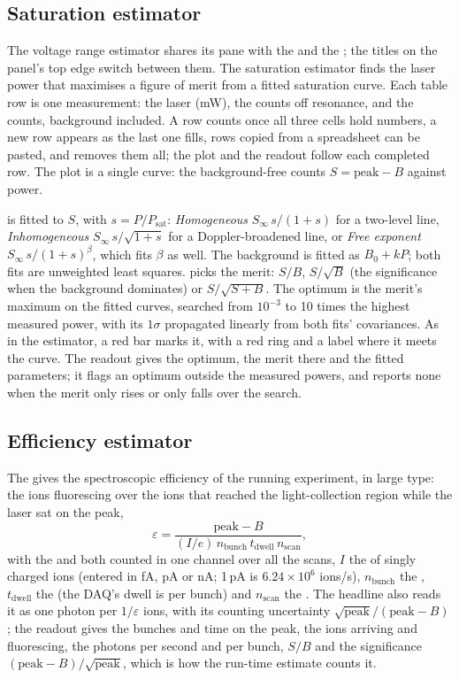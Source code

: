 \subsection{Saturation estimator}

The voltage range estimator shares its pane with the  and
the ; the titles on the panel's top edge
switch between them. The saturation estimator finds the laser power that maximises a
figure of merit from a fitted saturation curve. Each table row is one
measurement: the laser  (mW), the  counts off
resonance, and the  counts, background included. A row counts
once all three cells hold numbers, a new row appears as the last one
fills, rows copied from a spreadsheet can be pasted, and 
removes them all; the plot and the readout follow each completed row.
The plot is a single curve: the background-free counts
$S = \mathrm{peak} - B$ against power.

 is fitted to $S$, with $s = P/P_\mathrm{sat}$:
\emph{Homogeneous} $S_\infty\, s/(1+s)$ for a two-level line,
\emph{Inhomogeneous} $S_\infty\, s/\sqrt{1+s}$ for a Doppler-broadened
line, or \emph{Free exponent} $S_\infty\, s/(1+s)^\beta$, which fits
$\beta$ as well. The background is fitted as $B_0 + kP$; both fits are
unweighted least squares.  picks the merit: $S/B$,
$S/\sqrt{B}$ (the significance when the background dominates) or
$S/\sqrt{S+B}$. The optimum is the merit's maximum on the fitted
curves, searched from $10^{-3}$ to 10 times the highest measured power,
with its $1\sigma$ propagated linearly from both fits' covariances. As
in the estimator, a red bar marks it, with a red ring and a label where
it meets the curve. The readout gives the optimum, the merit there and
the fitted parameters; it flags an optimum outside the measured powers,
and reports none when the merit only rises or only falls over the
search.

\subsection{Efficiency estimator}

The  gives the spectroscopic efficiency of the
running experiment, in large type: the ions fluorescing over the ions
that reached the light-collection region while the laser sat on the peak,
\[
  \varepsilon = \frac{\mathrm{peak} - B}
    {(I/e)\, n_\mathrm{bunch}\, t_\mathrm{dwell}\, n_\mathrm{scan}},
\]
with the  and  both counted in one
channel over all the scans, $I$ the  of singly
charged ions (entered in fA, pA or nA; 1\,pA is
$6.24\times10^{6}$ ions/s), $n_\mathrm{bunch}$
the , $t_\mathrm{dwell}$ the 
(the DAQ's dwell is per bunch) and $n_\mathrm{scan}$ the .
The headline also reads it as one photon per $1/\varepsilon$ ions, with
its counting uncertainty $\sqrt{\mathrm{peak}}/(\mathrm{peak} - B)$; the
readout gives the bunches and time on the peak, the ions arriving and
fluorescing, the photons per second and per bunch, $S/B$ and the
significance $(\mathrm{peak} - B)/\sqrt{\mathrm{peak}}$, which is how
the run-time estimate counts it.

